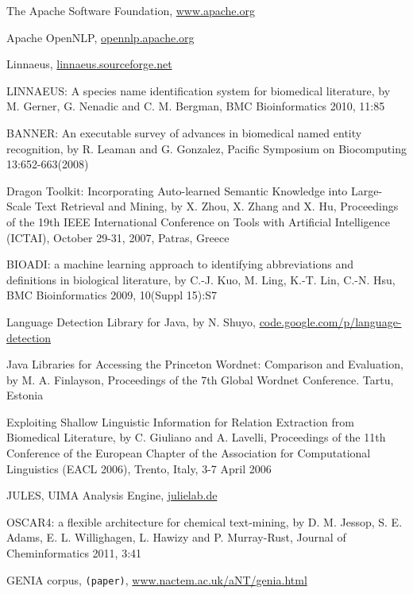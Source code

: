 \documentclass{article}
\newcommand{\TODO}[1]{\texttt{\textcolor{YellowOrange}{(#1)}}} %
\begin{document}
\begin{thebibliography}{99}
    The Apache Software Foundation,
    \href{http://www.apache.org/}{www.apache.org}

    Apache OpenNLP,
    \href{https://opennlp.apache.org/}{opennlp.apache.org}

    Linnaeus,
    \href{http://linnaeus.sourceforge.net/}{linnaeus.sourceforge.net}

    LINNAEUS: A species name identification system for biomedical literature,
    by M. Gerner, G. Nenadic and C. M. Bergman,
    BMC Bioinformatics 2010, 11:85

    BANNER: An executable survey of advances in biomedical named entity recognition,
    by R. Leaman and G. Gonzalez,
    Pacific Symposium on Biocomputing 13:652-663(2008)

    Dragon Toolkit: Incorporating Auto-learned Semantic Knowledge into Large-Scale Text Retrieval and Mining,
    by X. Zhou, X. Zhang and X. Hu,
    Proceedings of the 19th IEEE International Conference on Tools with Artificial Intelligence
    (ICTAI), October 29-31, 2007, Patras, Greece

    BIOADI: a machine learning approach to identifying abbreviations and definitions in biological
    literature,
    by C.-J. Kuo, M. Ling, K.-T. Lin, C.-N. Hsu,
    BMC Bioinformatics 2009, 10(Suppl 15):S7

    Language Detection Library for Java,
    by N. Shuyo,
    \href{http://code.google.com/p/language-detection/}{code.google.com/p/language-detection}

    Java Libraries for Accessing the Princeton Wordnet: Comparison and Evaluation,
    by M. A. Finlayson,
    Proceedings of the 7th Global Wordnet Conference. Tartu, Estonia

    Exploiting Shallow Linguistic Information for Relation Extraction from Biomedical Literature,
    by C. Giuliano and A. Lavelli,
    Proceedings of the 11th Conference of the European Chapter of the Association for Computational
    Linguistics (EACL 2006), Trento, Italy, 3-7 April 2006

    JULES, UIMA Analysis Engine,
    \href{http://www.julielab.de/Resources/JCoRe+NLP+Tools/Download/Documentation/UIMA+Analysis+Engine-p-103.html}{julielab.de}

    OSCAR4: a flexible architecture for chemical text-mining,
    by D. M. Jessop, S. E. Adams, E. L. Willighagen, L. Hawizy and P. Murray-Rust,
    Journal of Cheminformatics 2011, 3:41

    GENIA corpus,
	\TODO{paper},
    \href{http://www.nactem.ac.uk/aNT/genia.html}{www.nactem.ac.uk/aNT/genia.html}


\end{thebibliography}

\end{document}
